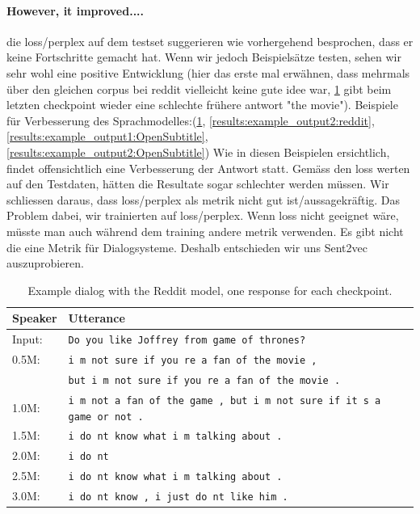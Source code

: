 \paragraph{However, it improved....} die loss/perplex auf dem testset suggerieren wie vorhergehend besprochen, dass er keine Fortschritte gemacht hat. Wenn wir jedoch Beispielsätze testen, sehen wir sehr wohl eine positive Entwicklung (hier das erste mal erwähnen, dass mehrmals über den gleichen corpus bei reddit vielleicht keine gute idee war, \ref{results:example_output1:reddit} gibt beim letzten checkpoint wieder eine schlechte frühere antwort "the movie"). Beispiele für Verbesserung des Sprachmodelles:(\ref{results:example_output1:reddit}, \ref{results:example_output2:reddit}, \ref{results:example_output1:OpenSubtitle}, \ref{results:example_output2:OpenSubtitle}) Wie in diesen Beispielen ersichtlich, findet offensichtlich eine Verbesserung der Antwort statt. Gemäss den loss werten auf den Testdaten, hätten die Resultate sogar schlechter werden müssen. Wir schliessen daraus, dass loss/perplex als metrik nicht gut ist/aussagekräftig. Das Problem dabei, wir trainierten auf loss/perplex. Wenn loss nicht geeignet wäre, müsste man auch während dem training andere metrik verwenden. Es gibt nicht die eine Metrik für Dialogsysteme. Deshalb entschieden wir  uns Sent2vec auszuprobieren.

\begin{table}[H]
	\centering
	\begin{adjustbox}{max width=\textwidth}
		\begin{tabular}{ll}
			\toprule
			Speaker & Utterance\\ \midrule
			Input: 	& \texttt{Do you like Joffrey from game of thrones?}\\
			0.5M: 	& \texttt{i m not sure if you re a fan of the movie ,}\\
			& \texttt{but i m not sure if you re a fan of the movie .}\\
			1.0M: 	& \texttt{i m not a fan of the game , but i m not sure if it s a game or not .}\\
			1.5M:	& \texttt{i do nt know what i m talking about .}\\
			2.0M:	& \texttt{i do nt }\\
			2.5M:	& \texttt{i do nt know what i m talking about .}\\
			3.0M:	& \texttt{i do nt know , i just do nt like him .}\\
			\bottomrule
		\end{tabular}
	\end{adjustbox}
	\caption{Example dialog with the Reddit model, one response for each checkpoint.}
	\label{results:example_output1:reddit}
\end{table}

